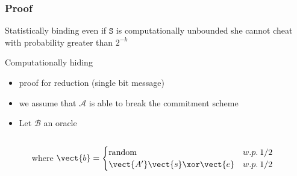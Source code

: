 \begin{frame}
\frametitle{Proof}
\begin{block}{Statistically binding}
 even if $\mathtt{S}$ is computationally unbounded she cannot cheat with probability greater than $2^{-k}$
\end{block}

\begin{block}{Computationally hiding}
 \begin{itemize}
  \item proof for reduction (single bit message)
  \item we assume that $\mathcal{A}$ is able to break the commitment scheme
  \begin{center}\end{center}
  \item Let $\mathcal{B}$ an oracle 
  \begin{columns}[c]
   \begin{center}
   \end{center}

where $\vect{b} = \begin{cases}
		      \mbox{random} & w.p. \: 1/2 \\
		      \vect{A'}\vect{s} \xor \vect{e} & w.p. \: 1/2
                  \end{cases}$
  \end{columns}

  \begin{center} \hspace{1.5cm} 
\end{center}
 \end{itemize}

\end{block}

\end{frame}

